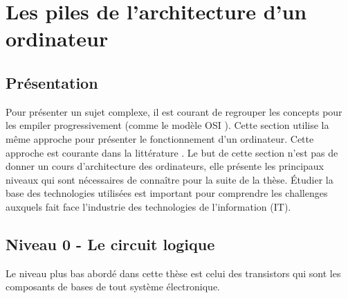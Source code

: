 \section{Les piles de l'architecture d'un ordinateur}




\subsection{Présentation}

Pour présenter un sujet complexe, il est courant de regrouper les concepts pour les empiler progressivement (comme le modèle OSI \cite{day1983osi}). Cette section utilise la même approche pour présenter le fonctionnement d'un ordinateur. Cette approche est courante dans la littérature \cite{tanenbaum2016structured, Jalby2013}. Le but de cette section n'est pas de donner un cours d'architecture des ordinateurs, elle présente les principaux niveaux qui sont nécessaires de connaître pour la suite de la thèse. Étudier la base des technologies utilisées est important pour comprendre les challenges auxquels fait face l'industrie des technologies de l'information (IT).



\subsection{Niveau 0 - Le circuit logique} \label{sec:logique}
Le niveau plus bas abordé dans cette thèse est celui des transistors qui sont les composants de bases de tout système électronique. 

